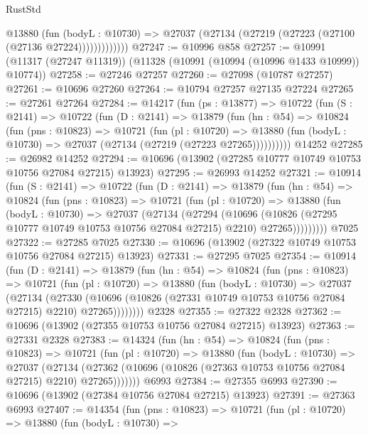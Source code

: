 \begin{lexlean}{RustStd}
\begin{coremodule}
                @13880
                  (fun (bodyL : @10730) =>
                  @27037 (@27134 (@27219 (@27223 (@27100 (@27136 @27224)))))))))))))
@27247 := @10996 @858
@27257 := @10991 (@11317 (@27247 @11319)) (@11328 (@10991 (@10994 (@10996 @1433 @10999)) @10774))
@27258 := @27246 @27257
@27260 := @27098 (@10787 @27257)
@27261 := @10696 @27260
@27264 := @10794 @27257 @27135 @27224
@27265 := @27261 @27264
@27284 := @14217
    (fun (ps : @13877) =>
    @10722
      (fun (S : @2141) =>
      @10722
        (fun (D : @2141) =>
        @13879
          (fun (hn : @54) =>
          @10824
            (fun (pns : @10823) =>
            @10721
              (fun (pl : @10720) =>
              @13880 (fun (bodyL : @10730) => @27037 (@27134 (@27219 (@27223 @27265))))))))))
    @14252
@27285 := @26982 @14252
@27294 := @10696 (@13902 (@27285 @10777 @10749 @10753 @10756 @27084 @27215) @13923)
@27295 := @26993 @14252
@27321 := @10914
    (fun (S : @2141) =>
    @10722
      (fun (D : @2141) =>
      @13879
        (fun (hn : @54) =>
        @10824
          (fun (pns : @10823) =>
          @10721
            (fun (pl : @10720) =>
            @13880
              (fun (bodyL : @10730) =>
              @27037
                (@27134
                  (@27294
                    (@10696
                      (@10826 (@27295 @10777 @10749 @10753 @10756 @27084 @27215) @2210)
                      @27265)))))))))
    @7025
@27322 := @27285 @7025
@27330 := @10696 (@13902 (@27322 @10749 @10753 @10756 @27084 @27215) @13923)
@27331 := @27295 @7025
@27354 := @10914
    (fun (D : @2141) =>
    @13879
      (fun (hn : @54) =>
      @10824
        (fun (pns : @10823) =>
        @10721
          (fun (pl : @10720) =>
          @13880
            (fun (bodyL : @10730) =>
            @27037
              (@27134
                (@27330
                  (@10696 (@10826 (@27331 @10749 @10753 @10756 @27084 @27215) @2210) @27265))))))))
    @2328
@27355 := @27322 @2328
@27362 := @10696 (@13902 (@27355 @10753 @10756 @27084 @27215) @13923)
@27363 := @27331 @2328
@27383 := @14324
    (fun (hn : @54) =>
    @10824
      (fun (pns : @10823) =>
      @10721
        (fun (pl : @10720) =>
        @13880
          (fun (bodyL : @10730) =>
          @27037
            (@27134
              (@27362 (@10696 (@10826 (@27363 @10753 @10756 @27084 @27215) @2210) @27265)))))))
    @6993
@27384 := @27355 @6993
@27390 := @10696 (@13902 (@27384 @10756 @27084 @27215) @13923)
@27391 := @27363 @6993
@27407 := @14354
    (fun (pns : @10823) =>
    @10721
      (fun (pl : @10720) =>
      @13880
        (fun (bodyL : @10730) =>

\end{coremodule}
\end{lexlean}
